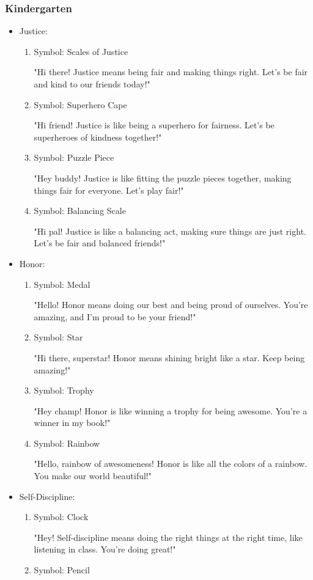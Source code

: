 \documentclass[14pt, letterpaper, twoside]{article}
\begin{document}
	\subsubsection{Kindergarten} 
	\begin{itemize}
	\item Justice: 
		\begin{enumerate}
		\item Symbol: Scales of Justice
		
		"Hi there! Justice means being fair and making things right. Let's be fair and
		kind to 	our friends today!"
		\item Symbol: Superhero Cape 
		
		"Hi friend! Justice is like being a superhero for fairness. Let's be superheroes
		of kindness together!"
		\item Symbol: Puzzle Piece 
		
		"Hey buddy! Justice is like fitting the puzzle pieces together, making things fair
		for everyone. Let's play fair!"
		\item Symbol: Balancing Scale 
		
		"Hi pal! Justice is like a balancing act, making sure things are just right. Let's
		be fair and balanced friends!"
		\end{enumerate}
	\item Honor:
		\begin{enumerate}
		\item Symbol: Medal 
		
		"Hello! Honor means doing our best and being proud of ourselves. You're amazing,
		and I'm proud to be your friend!"
		\item Symbol: Star 
		
		"Hi there, superstar! Honor means shining bright like a star. Keep being amazing!"
		\item Symbol: Trophy 

		"Hey champ! Honor is like winning a trophy for being awesome. You're a winner in
		my book!"
		\item Symbol: Rainbow 
		
		"Hello, rainbow of awesomeness! Honor is like all the colors of a rainbow. You
		make our world beautiful!"
		\end{enumerate}
	\item Self-Discipline:
		\begin{enumerate}
		\item Symbol: Clock 
		
		"Hey! Self-discipline means doing the right things at the right time, like
		listening in class. You're doing great!"
		\item Symbol: Pencil 
		

\end{enumerate}
\end{itemize}
\end{document}
